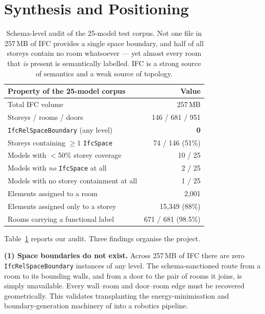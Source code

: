 \documentclass[10pt,twocolumn,letterpaper]{article}
\begin{document}
\section{Synthesis and Positioning}
\label{sec:gap}

\begin{table}[t]
\centering
\small
\setlength{\tabcolsep}{3.2pt}
\begin{tabular}{lr}
\toprule
\textbf{Property of the 25-model corpus} & \textbf{Value} \\
\midrule
Total IFC volume        & 257\,MB \\
Storeys / rooms / doors & 146 / 681 / 951 \\
\addlinespace
\texttt{IfcRelSpaceBoundary} (any level) & \textbf{0} \\
Storeys containing $\geq 1$ \texttt{IfcSpace} & 74 / 146 (51\%) \\
Models with $<$50\% storey coverage & 10 / 25 \\
Models with \emph{no} \texttt{IfcSpace} at all & 2 / 25 \\
Models with no storey containment at all & 1 / 25 \\
\addlinespace
Elements assigned to a room & 2{,}001 \\
Elements assigned only to a storey & 15{,}349 (88\%) \\
\addlinespace
Rooms carrying a functional label & 671 / 681 (98.5\%) \\
\bottomrule
\end{tabular}
\caption{Schema-level audit of the 25-model test corpus. Not one file in
257\,MB of IFC provides a single space boundary, and half of all storeys contain
no room whatsoever --- yet almost every room that \emph{is} present is
semantically labelled. IFC is a strong source of semantics and a weak source of
topology.}
\label{tab:audit}
\end{table}

Table~\ref{tab:audit} reports our audit. Three findings organise the project.

\medskip\noindent\textbf{(1) Space boundaries do not exist.} Across 257\,MB of
IFC there are zero \texttt{IfcRelSpaceBoundary} instances of any level. The
schema-sanctioned route from a room to its bounding walls, and from a door to
the pair of rooms it joins, is simply unavailable. Every wall--room and
door--room edge must be recovered geometrically. This validates transplanting
the energy-minimisation and boundary-generation machinery of
\cite{lilis2017spaceboundary,ochmann2016parametric} into a robotics pipeline.
\end{document}
